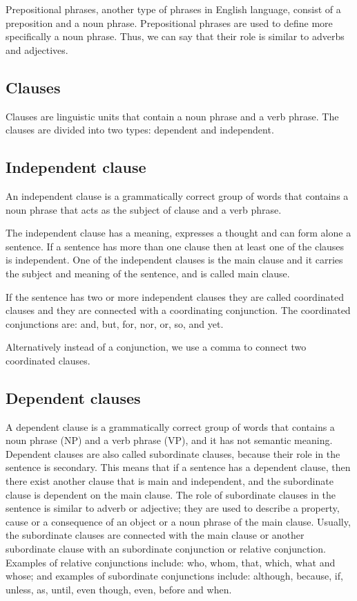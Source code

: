 \vspace{4mm}

Prepositional phrases, another type of phrases in English language, consist of a preposition and a noun phrase. Prepositional phrases are used to define more specifically a noun phrase. Thus, we can say that their role is similar to adverbs and adjectives.

\subsection{Clauses}

Clauses are linguistic units that contain a noun phrase and a verb phrase. The clauses are divided into two types: dependent and independent.

\subsection{Independent clause}

An independent clause is a grammatically correct group of words that contains a noun phrase that acts as the subject of clause and a verb phrase.

The independent clause has a meaning, expresses a thought and can form alone a sentence. If a sentence has more than one clause then at least one of the clauses is independent. One of the independent clauses is the main clause and it carries the subject and meaning of the sentence, and is called main clause.

If the sentence has two or more independent clauses they are called coordinated clauses and they are connected with a coordinating conjunction. The coordinated conjunctions are: and, but, for, nor, or, so, and yet.

Alternatively instead of a conjunction, we use a comma to connect two coordinated clauses.

\subsection{Dependent clauses}

A dependent clause is a grammatically correct group of words that contains a noun phrase (NP) and a verb phrase (VP), and it has not semantic meaning. Dependent clauses are also called subordinate clauses, because their role in the sentence is secondary. This means that if a sentence has a dependent clause, then there exist another clause that is main and independent, and the subordinate clause is dependent on the main clause. The role of subordinate clauses in the sentence is similar to adverb or adjective; they are used to describe a property, cause or a consequence of an object or a noun phrase of the main clause. Usually, the subordinate clauses are connected with the main clause or another subordinate clause with an subordinate conjunction or relative conjunction. Examples of relative conjunctions include: who, whom, that, which, what and whose; and examples of subordinate conjunctions include: although, because, if, unless, as, until, even though, even, before and when.

